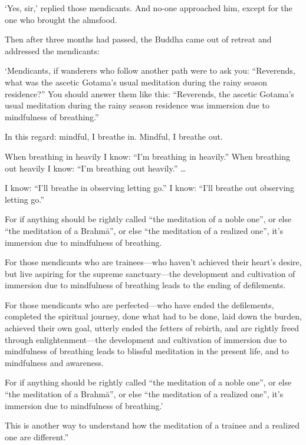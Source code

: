 \documentclass[12pt,openany]{book}%
\begin{document}
‘Yes, sir,’ replied those mendicants. And no-one approached him, except for the one who brought the almsfood. 

Then after three months had passed, the Buddha came out of retreat and addressed the mendicants: 

‘Mendicants, if wanderers who follow another path were to ask you: “Reverends, what was the ascetic Gotama’s usual meditation during the rainy season residence?” You should answer them like this: “Reverends, the ascetic Gotama’s usual meditation during the rainy season residence was immersion due to mindfulness of breathing.” 

In this regard: mindful, I breathe in. Mindful, I breathe out. 

When breathing in heavily I know: “I’m breathing in heavily.” When breathing out heavily I know: “I’m breathing out heavily.” … 

I know: “I’ll breathe in observing letting go.” I know: “I’ll breathe out observing letting go.” 

For if anything should be rightly called “the meditation of a noble one”, or else “the meditation of a \textsanskrit{Brahmā}”, or else “the meditation of a realized one”, it’s immersion due to mindfulness of breathing. 

For those mendicants who are trainees—who haven’t achieved their heart’s desire, but live aspiring for the supreme sanctuary—the development and cultivation of immersion due to mindfulness of breathing leads to the ending of defilements. 

For those mendicants who are perfected—who have ended the defilements, completed the spiritual journey, done what had to be done, laid down the burden, achieved their own goal, utterly ended the fetters of rebirth, and are rightly freed through enlightenment—the development and cultivation of immersion due to mindfulness of breathing leads to blissful meditation in the present life, and to mindfulness and awareness. 

For if anything should be rightly called “the meditation of a noble one”, or else “the meditation of a \textsanskrit{Brahmā}”, or else “the meditation of a realized one”, it’s immersion due to mindfulness of breathing.’ 

This is another way to understand how the meditation of a trainee and a realized one are different.” 
\end{document}
